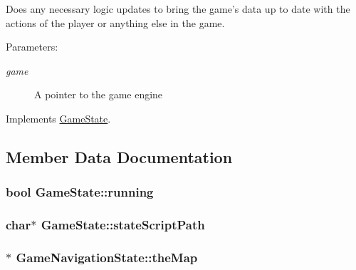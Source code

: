 Does any necessary logic updates to bring the game's data up to date with the actions of the player or anything else in the game.

\begin{Desc}
\item[Parameters:]
\begin{description}
\item[{\em game}]A pointer to the game engine \end{description}
\end{Desc}


Implements \hyperlink{class_game_state_100ca49bc95afce1d5c5b756708bbc2b}{GameState}.

\subsection{Member Data Documentation}
\hypertarget{class_game_state_391df04a740c7480270d3c71a578b43a}{
\subsubsection[{running}]{\setlength{\rightskip}{0pt plus 5cm}bool {\bf GameState::running}}}
\label{dd/d87/class_game_state_391df04a740c7480270d3c71a578b43a}


\hypertarget{class_game_state_bfe09abe78dd5794426964d3392b2973}{
\subsubsection[{stateScriptPath}]{\setlength{\rightskip}{0pt plus 5cm}char$\ast$ {\bf GameState::stateScriptPath}}}
\label{dd/d87/class_game_state_bfe09abe78dd5794426964d3392b2973}


\hypertarget{class_game_navigation_state_83154f9523275696f30c13447e1d74f3}{
\subsubsection[{theMap}]{$\ast$ {\bf GameNavigationState::theMap}}}
\label{de/d2a/class_game_navigation_state_83154f9523275696f30c13447e1d74f3}


